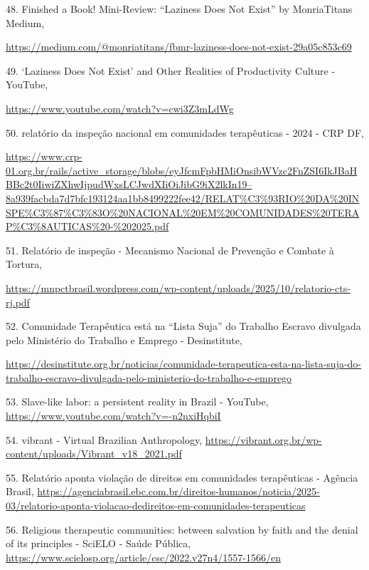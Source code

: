 48. Finished a Book! Mini-Review: ``Laziness Does Not Exist'' \textbar{} by MonriaTitans \textbar{} Medium,

\href{https://medium.com/@monriatitans/fbmr-laziness-does-not-exist-29a05c853c69}{https://medium.com/@monriatitans/fbmr-laziness-does-not-exist-29a05c853c69}

49. `Laziness Does Not Exist' and Other Realities of Productivity Culture - YouTube,

\url{https://www.youtube.com/watch?v=cwi3Z3mLdWg}

50. relatório da inspeção nacional em comunidades terapêuticas - 2024 - CRP DF,

\href{https://www.crp-01.org.br/rails/active_storage/blobs/eyJfcmFpbHMiOnsibWVzc2FnZSI6IkJBaHBBc2t0IiwiZXhwIjpudWxsLCJwdXIiOiJibG9iX2lkIn19--8a939facbda7d7bfc193124aa1bb8499222fee42/RELAT\%C3\%93RIO\%20DA\%20INSPE\%C3\%87\%C3\%83O\%20NACIONAL\%20EM\%20COMUNIDADES\%20TERAP\%C3\%8AUTICAS\%20-\%202025.pdf}{https://www.crp-01.org.br/rails/active\_storage/blobs/eyJfcmFpbHMiOnsibWVzc2FnZSI6IkJBaHBBc2t0IiwiZXhwIjpudWxsLCJwdXIiOiJibG9iX2lkIn19--8a939facbda7d7bfc193124aa1bb8499222fee42/RELAT\%C3\%93RIO\%20DA\%20INSPE\%C3\%87\%C3\%83O\%20NACIONAL\%20EM\%20COMUNIDADES\%20TERAP\%C3\%8AUTICAS\%20-\%202025.pdf}

51. Relatório de inspeção - Mecanismo Nacional de Prevenção e Combate à Tortura,

\url{https://mnpctbrasil.wordpress.com/wp-content/uploads/2025/10/relatorio-cts-rj.pdf}

52. Comunidade Terapêutica está na ``Lista Suja'' do Trabalho Escravo divulgada pelo Ministério do Trabalho e Emprego - Desinstitute,

\url{https://desinstitute.org.br/noticias/comunidade-terapeutica-esta-na-lista-suja-do-trabalho-escravo-divulgada-pelo-ministerio-do-trabalho-e-emprego}

53. Slave-like labor: a persistent reality in Brazil - YouTube, \url{https://www.youtube.com/watch?v=-n2nxiHqbiI}

54. vibrant - Virtual Brazilian Anthropology, \url{https://vibrant.org.br/wp-content/uploads/Vibrant_v18_2021.pdf}

55. Relatório aponta violação de direitos em comunidades terapêuticas - Agência Brasil, \url{https://agenciabrasil.ebc.com.br/direitos-humanos/noticia/2025-03/relatorio-aponta-violacao-dedireitos-em-comunidades-terapeuticas}

56. Religious therapeutic communities: between salvation by faith and the denial of its principles - SciELO - Saúde Pública, \url{https://www.scielosp.org/article/csc/2022.v27n4/1557-1566/en}

